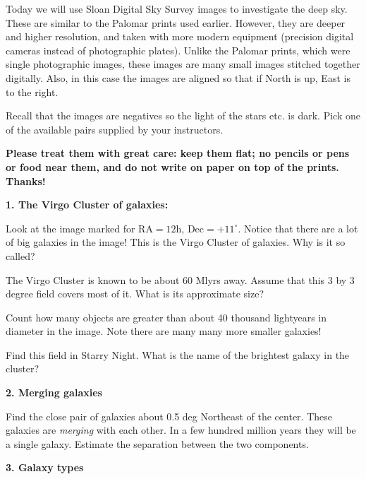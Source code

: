 
\noindent Today we will use Sloan Digital Sky Survey images
to investigate the deep sky. These are similar to the Palomar prints
used earlier. However, they are deeper and higher resolution, and
taken with more modern equipment (precision digital cameras instead of
photographic plates). Unlike the Palomar prints, which were single
photographic images, these images are many small images stitched
together digitally. Also, in this case the images are aligned so that
if North is up, East is to the right.

Recall that the images are negatives so the light of the stars etc. is
dark. Pick one of the available pairs supplied by your instructors.

{\bf Please treat them with great care: keep them flat; no pencils or
pens or food near them, and do not write on paper on top of the
prints. Thanks!}

\noindent
{\bf 1. The Virgo Cluster of galaxies:} 

\noindent Look at the image marked for RA$=12$h,
Dec$=+11^\circ$. Notice that there are a lot of big galaxies in the
image! This is the Virgo Cluster of galaxies.  Why is it so called?

\vspace{20pt}

\noindent The Virgo Cluster is known to be about 60 Mlyrs away.
Assume that this 3 by 3 degree field covers most of it.  What is its
approximate size?

\vspace{40pt}

\noindent Count how many objects are greater than about 40 thousand
lightyears in diameter in the image. Note there are many many more
smaller galaxies!

\vspace{40pt}

\noindent Find this field in Starry Night.  What is the name of the
brightest galaxy in the cluster?

\vspace{20pt}

\noindent
{\bf 2. Merging galaxies}

\noindent Find the close pair of galaxies about 0.5 deg Northeast of the
center. These galaxies are {\it merging} with each other.  In a few
hundred million years they will be a single galaxy.  Estimate the
separation between the two components.

\clearpage

\noindent 
{\bf 3. Galaxy types}

